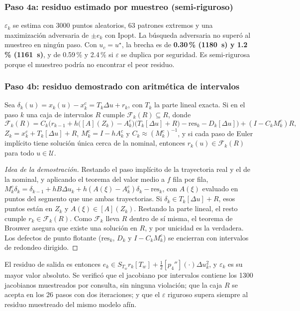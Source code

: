 \subsubsection{Paso 4a: residuo estimado por muestreo (semi-riguroso)}
$\varepsilon_k$ se estima con 3000 puntos aleatorios, 63 patrones extremos y una
maximización adversaria de $\pm e_k$ con Ipopt. La búsqueda adversaria no superó al
muestreo en ningún paso. Con $u_c=u^\star$, la brecha es de \textbf{0.30\,\% (1180~s) y 1.2\,\%
(1161~s)}, y de 0.59\,\% y 2.4\,\% si $\varepsilon$ se duplica por seguridad. Es
semi-rigurosa porque el muestreo podría no encontrar el peor residuo.

\subsubsection{Paso 4b: residuo demostrado con aritmética de intervalos}
\begin{proposicion}\label{prop:taylor}
Sea $\delta_k(u)=x_k(u)-x^c_k=T_k\Delta u+r_k$, con $T_k$ la parte lineal exacta. Si en el
paso $k$ una caja de intervalos $R$ cumple $\mathcal F_k(R)\subseteq R$, donde
\[
\mathcal F_k(R)=C_k\Big(r_{k-1}+h\big([A](Z_k)-A^c_k\big)\big(T_k[\Delta u]+R\big)-\mathrm{res}_k-D_k[\Delta u]\Big)+(I-C_kM^c_k)R,
\]
$Z_k=x^c_k+T_k[\Delta u]+R$, $M^c_k=I-hA^c_k$ y $C_k\approx(M^c_k)^{-1}$, y si cada paso de
Euler implícito tiene solución única cerca de la nominal, entonces $r_k(u)\in\mathcal F_k(R)$
para todo $u\in\mathcal U$.
\end{proposicion}
\begin{proof}[Idea de la demostración]
Restando el paso implícito de la trayectoria real y el de la nominal, y aplicando el
teorema del valor medio a $f$ fila por fila, $M^c_k\delta_k=\delta_{k-1}+hB\Delta u_k
+h(A(\xi)-A^c_k)\delta_k-\mathrm{res}_k$, con $A(\xi)$ evaluado en puntos del segmento que
une ambas trayectorias. Si $\delta_k\in T_k[\Delta u]+R$, esos puntos están en $Z_k$ y
$A(\xi)\in[A](Z_k)$. Restando la parte lineal, el resto cumple $r_k\in\mathcal F_k(R)$.
Como $\mathcal F_k$ lleva $R$ dentro de sí misma, el teorema de Brouwer asegura que existe
una solución en $R$, y por unicidad es la verdadera. Los defectos de punto flotante
($\mathrm{res}_k$, $D_k$ y $I-C_kM^c_k$) se encierran con intervalos de redondeo dirigido.
\end{proof}

\noindent El residuo de salida es entonces
$e_k\in S_{T_w}r_k[T_w]+\tfrac12[p_4''](\cdot)\Delta u_k^2$, y $\varepsilon_k$ es su mayor
valor absoluto. Se verificó que el jacobiano por intervalos contiene los 1300 jacobianos
muestreados por consulta, sin ninguna violación; que la caja $R$ se acepta en los 26 pasos
con dos iteraciones; y que el $\varepsilon$ riguroso supera siempre al residuo muestreado
del mismo modelo afín.

